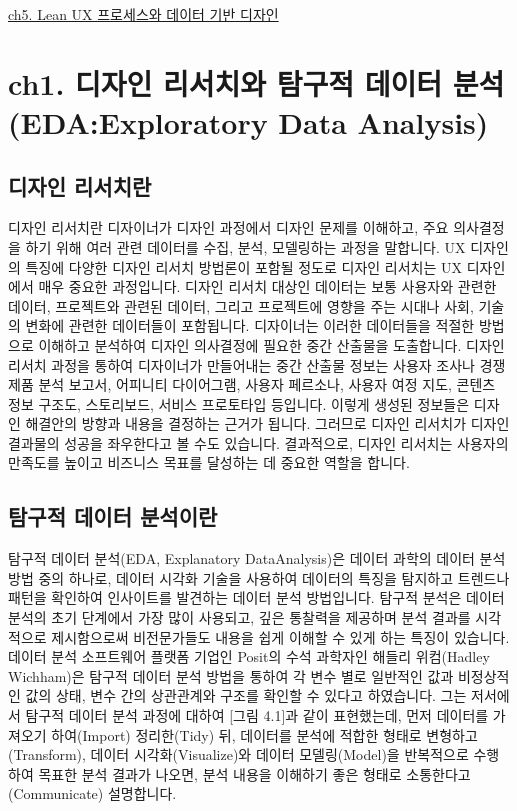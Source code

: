 \documentclass[
  letterpaper,
]{book}
\begin{document}
\href{ch5.\%20Lean\%20UX\%20프로세스와\%20데이터\%20기반\%20디자인.qmd}{ch5.
Lean UX 프로세스와 데이터 기반 디자인}

\chapter{ch1. 디자인 리서치와 탐구적 데이터 분석 (EDA:Exploratory Data
Analysis)}\label{ch1.-uxb514uxc790uxc778-uxb9acuxc11cuxce58uxc640-uxd0d0uxad6cuxc801-uxb370uxc774uxd130-uxbd84uxc11d-edaexploratory-data-analysis}

\section{디자인
리서치란}\label{uxb514uxc790uxc778-uxb9acuxc11cuxce58uxb780}

디자인 리서치란 디자이너가 디자인 과정에서 디자인 문제를 이해하고, 주요
의사결정을 하기 위해 여러 관련 데이터를 수집, 분석, 모델링하는 과정을
말합니다. UX 디자인의 특징에 다양한 디자인 리서치 방법론이 포함될 정도로
디자인 리서치는 UX 디자인에서 매우 중요한 과정입니다. 디자인 리서치
대상인 데이터는 보통 사용자와 관련한 데이터, 프로젝트와 관련된 데이터,
그리고 프로젝트에 영향을 주는 시대나 사회, 기술의 변화에 관련한
데이터들이 포함됩니다. 디자이너는 이러한 데이터들을 적절한 방법으로
이해하고 분석하여 디자인 의사결정에 필요한 중간 산출물을 도출합니다.
디자인 리서치 과정을 통하여 디자이너가 만들어내는 중간 산출물 정보는
사용자 조사나 경쟁 제품 분석 보고서, 어피니티 다이어그램, 사용자
페르소나, 사용자 여정 지도, 콘텐츠 정보 구조도, 스토리보드, 서비스
프로토타입 등입니다. 이렇게 생성된 정보들은 디자인 해결안의 방향과
내용을 결정하는 근거가 됩니다. 그러므로 디자인 리서치가 디자인 결과물의
성공을 좌우한다고 볼 수도 있습니다. 결과적으로, 디자인 리서치는 사용자의
만족도를 높이고 비즈니스 목표를 달성하는 데 중요한 역할을 합니다.

\section{탐구적 데이터
분석이란}\label{uxd0d0uxad6cuxc801-uxb370uxc774uxd130-uxbd84uxc11duxc774uxb780}

탐구적 데이터 분석(EDA, Explanatory DataAnalysis)은 데이터 과학의 데이터
분석 방법 중의 하나로, 데이터 시각화 기술을 사용하여 데이터의 특징을
탐지하고 트렌드나 패턴을 확인하여 인사이트를 발견하는 데이터 분석
방법입니다. 탐구적 분석은 데이터 분석의 초기 단계에서 가장 많이
사용되고, 깊은 통찰력을 제공하며 분석 결과를 시각적으로 제시함으로써
비전문가들도 내용을 쉽게 이해할 수 있게 하는 특징이 있습니다. 데이터
분석 소프트웨어 플랫폼 기업인 Posit의 수석 과학자인 해들리 위컴(Hadley
Wichham)은 탐구적 데이터 분석 방법을 통하여 각 변수 별로 일반적인 값과
비정상적인 값의 상태, 변수 간의 상관관계와 구조를 확인할 수 있다고
하였습니다. 그는 저서에서 탐구적 데이터 분석 과정에 대하여 {[}그림
4.1{]}과 같이 표현했는데, 먼저 데이터를 가져오기 하여(Import)
정리한(Tidy) 뒤, 데이터를 분석에 적합한 형태로 변형하고(Transform),
데이터 시각화(Visualize)와 데이터 모델링(Model)을 반복적으로 수행하여
목표한 분석 결과가 나오면, 분석 내용을 이해하기 좋은 형태로
소통한다고(Communicate) 설명합니다.
\end{document}
